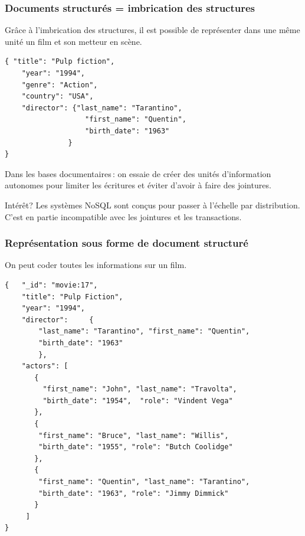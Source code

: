 \begin{frame}[fragile]
\frametitle{Documents structurés = imbrication des structures}

Grâce à \alert{l'imbrication des structures}, il est possible de
représenter dans une même unité un film \alert{et} son metteur en scène.

\smallskip

\begin{verbatim}
{ "title": "Pulp fiction",
    "year": "1994",
    "genre": "Action",
    "country": "USA",
    "director": {"last_name": "Tarantino",
	               "first_name": "Quentin",
	               "birth_date": "1963"	
               }
}
\end{verbatim}

\smallskip

Dans les bases documentaires\,: on essaie de créer des unités d'information \alert{autonomes} 
pour limiter les écritures et éviter d'avoir à faire des jointures.

\begin{remblock}{Intérêt?}
Les systèmes NoSQL sont conçus pour passer à l'échelle par distribution. C'est en
partie incompatible avec les jointures et les transactions.
\end{remblock}
\end{frame}



\begin{frame}[fragile]
\frametitle{Représentation sous forme de document structuré}

On peut coder toutes les informations sur un film.
\begin{verbatim}
{   "_id": "movie:17",
    "title": "Pulp Fiction",
    "year": "1994",
    "director": 	{
	    "last_name": "Tarantino", "first_name": "Quentin", 
	    "birth_date": "1963"	
	    },
    "actors": [
       {
         "first_name": "John", "last_name": "Travolta", 
         "birth_date": "1954",  "role": "Vindent Vega"	
       },
       {
        "first_name": "Bruce", "last_name": "Willis", 
        "birth_date": "1955", "role": "Butch Coolidge"	
       },
       {
        "first_name": "Quentin", "last_name": "Tarantino", 
        "birth_date": "1963", "role": "Jimmy Dimmick"	
       }
     ]
}
\end{verbatim}

\end{frame}


